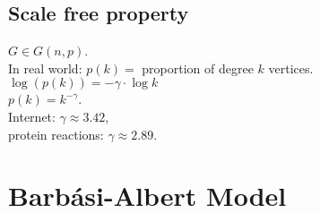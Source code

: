 \documentclass[a4paper, 12pt]{book}
\theoremstyle{definition}
\theoremstyle{remark}
\begin{document}
\subsection{Scale free property}

$G \in G(n,p)$. \\
In real world:
$p(k) = $ proportion of degree $k$ vertices. \\
$\log(p(k)) = -\gamma \cdot \log k$ \\
$p(k) = k^{-\gamma}$. \\
Internet: $\gamma \approx 3.42$, \\
protein reactions: $\gamma \approx 2.89$.


\section{Barbási-Albert Model}
\end{document}
